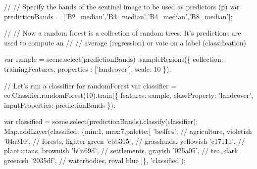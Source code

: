 \documentclass[]{article}
\newenvironment{Shaded}{}{}
\newcommand{\AttributeTok}[1]{#1}
\newcommand{\CommentTok}[1]{\textcolor[rgb]{0.00,0.50,0.00}{#1}}
\newcommand{\DataTypeTok}[1]{#1}
\newcommand{\DecValTok}[1]{#1}
\newcommand{\KeywordTok}[1]{\textcolor[rgb]{0.00,0.00,1.00}{#1}}
\newcommand{\NormalTok}[1]{#1}
\newcommand{\OperatorTok}[1]{#1}
\newcommand{\StringTok}[1]{\textcolor[rgb]{0.00,0.50,0.50}{#1}}
\newcommand{\VariableTok}[1]{#1}
\begin{document}
\begin{Shaded}
\begin{Highlighting}[numbers=left,,]
\CommentTok{// // Specify the bands of the sentinel image to be used as predictors (p)}
\KeywordTok{var}\NormalTok{ predictionBands }\OperatorTok{=}\NormalTok{ [}\StringTok{'B2_median'}\OperatorTok{,}\StringTok{'B3_median'}\OperatorTok{,}\StringTok{'B4_median'}\OperatorTok{,}\StringTok{'B8_median'}\NormalTok{]}\OperatorTok{;}


\CommentTok{// // Now a random forest is a collection of random trees. It's predictions are used to compute an}
\CommentTok{// // average (regression) or vote on a label (classification)}

\KeywordTok{var}\NormalTok{ sample }\OperatorTok{=} \VariableTok{scene}\NormalTok{.}\AttributeTok{select}\NormalTok{(predictionBands)}
\NormalTok{                      .}\AttributeTok{sampleRegions}\NormalTok{(}\OperatorTok{\{}
                        \DataTypeTok{collection}\OperatorTok{:}\NormalTok{ trainingFeatures}\OperatorTok{,}
                        \DataTypeTok{properties }\OperatorTok{:}\NormalTok{ [}\StringTok{'landcover'}\NormalTok{]}\OperatorTok{,}
                        \DataTypeTok{scale}\OperatorTok{:} \DecValTok{10}
                              \OperatorTok{\}}\NormalTok{)}\OperatorTok{;}

\CommentTok{// Let's run a classifier for randomForest}
\KeywordTok{var}\NormalTok{ classifier }\OperatorTok{=} \VariableTok{ee}\NormalTok{.}\VariableTok{Classifier}\NormalTok{.}\AttributeTok{randomForest}\NormalTok{(}\DecValTok{10}\NormalTok{).}\AttributeTok{train}\NormalTok{(}\OperatorTok{\{}
                            \DataTypeTok{features}\OperatorTok{:}\NormalTok{ sample}\OperatorTok{,}
                            \DataTypeTok{classProperty}\OperatorTok{:} \StringTok{'landcover'}\OperatorTok{,}
                            \DataTypeTok{inputProperties}\OperatorTok{:}\NormalTok{ predictionBands}
\OperatorTok{\}}\NormalTok{)}\OperatorTok{;}


\KeywordTok{var}\NormalTok{ classified }\OperatorTok{=} \VariableTok{scene}\NormalTok{.}\AttributeTok{select}\NormalTok{(predictionBands).}\AttributeTok{classify}\NormalTok{(classifier)}\OperatorTok{;}
\VariableTok{Map}\NormalTok{.}\AttributeTok{addLayer}\NormalTok{(classified}\OperatorTok{,} \OperatorTok{\{}\DataTypeTok{min}\OperatorTok{:}\DecValTok{1}\OperatorTok{,} \DataTypeTok{max}\OperatorTok{:}\DecValTok{7}\OperatorTok{,}\DataTypeTok{palette}\OperatorTok{:}\NormalTok{[}
  \StringTok{'be4fc4'}\OperatorTok{,} \CommentTok{// agriculture, violetish}
  \StringTok{'04a310'}\OperatorTok{,} \CommentTok{// forests, lighter green}
  \StringTok{'cbb315'}\OperatorTok{,} \CommentTok{// grasslands, yellowish}
  \StringTok{'c17111'}\OperatorTok{,} \CommentTok{// plantations, brownish}
  \StringTok{'b0a69d'}\OperatorTok{,} \CommentTok{// settlements, grayish}
  \StringTok{'025a05'}\OperatorTok{,} \CommentTok{// tea, dark greenish}
  \StringTok{'2035df'}\OperatorTok{,} \CommentTok{// waterbodies, royal blue }
\NormalTok{  ]}\OperatorTok{\},} \StringTok{'classified'}\NormalTok{)}\OperatorTok{;}


\end{Highlighting}
\end{Shaded}
\end{document}
